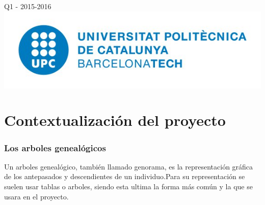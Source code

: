 \documentclass[12pt]{article} %
\begin{document}
\begin{titlepage}

{\large Q1 - 2015-2016}\\[2cm] %


\includegraphics[scale=0.7]{logo_upc.png}\\[1cm] %
 

\vfill %

\end{titlepage}


\tableofcontents %

\newpage %

\section{Contextualización del proyecto}

\subsubsection{Los arboles genealógicos}
Un arboles genealógico, también llamado genorama, es la representación gráfica de los antepasados  y descendientes de un individuo.Para su representación  se suelen usar tablas o arboles, siendo esta ultima la forma más común y la que se usara en el proyecto.
\end{document}
